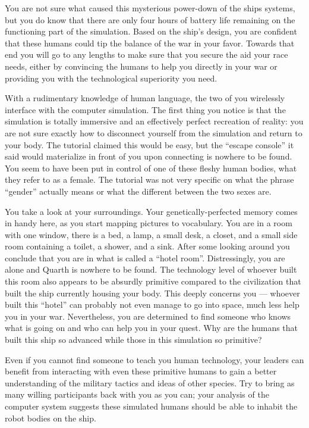 \documentclass[char]{guildcamp1}
\begin{document}
You are not sure what caused this mysterious power-down of the ships systems, but you do know that there are only four hours of battery life remaining on the functioning part of the simulation.
Based on the ship's design, you are confident that these humans could tip the balance of the war in your favor. Towards that end you will go to any lengths to make sure that you secure the aid your race needs, either by convincing the humans to help you directly in your war or providing you with the technological superiority you need.

With a rudimentary knowledge of human language, the two of you wirelessly interface with the computer simulation. The first thing you notice is that the simulation is totally immersive and an effectively perfect recreation of reality: you are not sure exactly how to disconnect yourself from the simulation and return to your body. The tutorial claimed this would be easy, but the ``escape console'' it said would materialize in front of you upon connecting is nowhere to be found. You seem to have been put in control of one of these fleshy human bodies, what they refer to as a female. The tutorial was not very specific on what the phrase ``gender'' actually means or what the different between the two sexes are.

You take a look at your surroundings. Your genetically-perfected memory comes in handy here, as you start mapping pictures to vocabulary. You are in a room with one window, there is a bed, a lamp, a small desk, a closet, and a small side room containing a toilet, a shower, and a sink. After some looking around you conclude that you are in what is called a ``hotel room''. Distressingly, you are alone and Quarth is nowhere to be found. The technology level of whoever built this room also appears to be absurdly primitive compared to the civilization that built the ship currently housing your body. This deeply concerns you --- whoever built this ``hotel'' can probably not even manage to go into space, much less help you in your war. Nevertheless, you are determined to find someone who knows what is going on and who can help you in your quest. Why are the humans that built this ship so advanced while those in this simulation so primitive?

Even if you cannot find someone to teach you human technology, your leaders can benefit from interacting with even these primitive humans to gain a better understanding of the military tactics and ideas of other species. Try to bring as many willing participants back with you as you can; your analysis of the computer system suggests these simulated humans should be able to inhabit the robot bodies on the ship.
\end{document}
